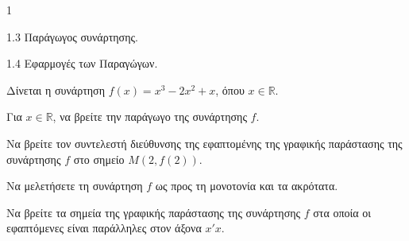 \begin{ylh}{1}
    \item 1.3 Παράγωγος συνάρτησης.
    \item 1.4 Εφαρμογές των Παραγώγων.
\end{ylh}
Δίνεται η συνάρτηση $f(x) = x^3 - 2x^2 + x$, όπου $x \in \mathbb{R}$.
\begin{alist}
    \item 
    \begin{rlist}
        \item Για $x \in \mathbb{R}$, να βρείτε την παράγωγο της συνάρτησης $f$. 
        \item Να βρείτε τον συντελεστή διεύθυνσης της εφαπτομένης της γραφικής παράστασης της συνάρτησης $f$ στο σημείο $M(2, f(2))$. 
    \end{rlist}
    
    \item Να μελετήσετε τη συνάρτηση $f$ ως προς τη μονοτονία και τα ακρότατα. 
    
    \item Να βρείτε τα σημεία της γραφικής παράστασης της συνάρτησης $f$ στα οποία οι εφαπτόμενες είναι παράλληλες στον άξονα $x'x$. 
\end{alist}

